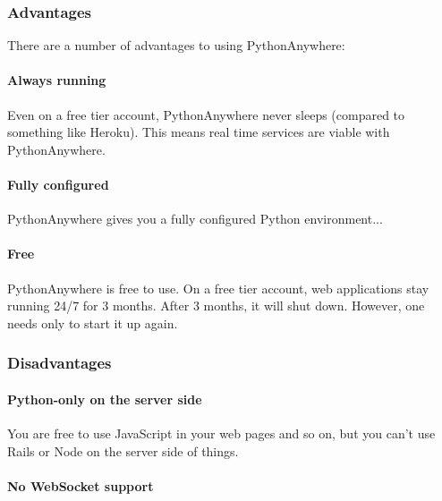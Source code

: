 \subsubsection{Advantages}
There are a number of advantages to using PythonAnywhere:

\paragraph{Always running}
Even on a free tier account, PythonAnywhere never sleeps (compared to something like Heroku). This means real time services are viable with PythonAnywhere.

\paragraph{Fully configured}
PythonAnywhere gives you a fully configured Python environment...

\paragraph{Free}
PythonAnywhere is free to use. On a free tier account, web applications stay running 24/7 for 3 months. After 3 months, it will shut down. However, one needs only to start it up again.

\subsubsection{Disadvantages}

\paragraph{Python-only on the server side}
You are free to use JavaScript in your web pages and so on, but you can't use Rails or Node on the server side of things.

\paragraph{No WebSocket support}
